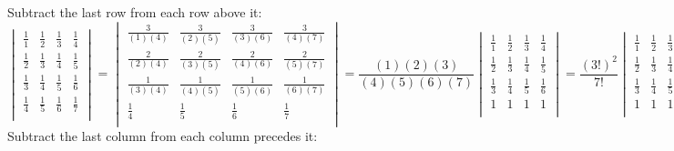 \documentclass[a4paper]{article}
\begin{document}
Subtract the last row from each row above it:
\renewcommand{\arraystretch}{1.5}
\[
\begin{vmatrix}
\frac{1}{1}&\frac{1}{2}&\frac{1}{3}&\frac{1}{4}\\
\frac{1}{2}&\frac{1}{3}&\frac{1}{4}&\frac{1}{5}\\ 
\frac{1}{3}&\frac{1}{4}&\frac{1}{5}&\frac{1}{6}\\
\frac{1}{4}&\frac{1}{5}&\frac{1}{6}&\frac{1}{7}\\
\end{vmatrix}
=
\begin{vmatrix}
\frac{3}{(1)(4)}&\frac{3}{(2)(5)}&\frac{3}{(3)(6)}&\frac{3}{(4)(7)}\\
\frac{2}{(2)(4)}&\frac{2}{(3)(5)}&\frac{2}{(4)(6)}&\frac{2}{(5)(7)}\\ 
\frac{1}{(3)(4)}&\frac{1}{(4)(5)}&\frac{1}{(5)(6)}&\frac{1}{(6)(7)}\\
\frac{1}{4}&\frac{1}{5}&\frac{1}{6}&\frac{1}{7}\\
\end{vmatrix}
=
\frac{(1)(2)(3)}{(4)(5)(6)(7)}
\begin{vmatrix}
\frac{1}{1}&\frac{1}{2}&\frac{1}{3}&\frac{1}{4}\\
\frac{1}{2}&\frac{1}{3}&\frac{1}{4}&\frac{1}{5}\\ 
\frac{1}{3}&\frac{1}{4}&\frac{1}{5}&\frac{1}{6}\\
1&1&1&1\\
\end{vmatrix}
=
\frac{(3!)^2}{7!}
\begin{vmatrix}
\frac{1}{1}&\frac{1}{2}&\frac{1}{3}&\frac{1}{4}\\
\frac{1}{2}&\frac{1}{3}&\frac{1}{4}&\frac{1}{5}\\ 
\frac{1}{3}&\frac{1}{4}&\frac{1}{5}&\frac{1}{6}\\
1&1&1&1\\
\end{vmatrix}
\]
Subtract the last column from each column precedes it:
\end{document}
